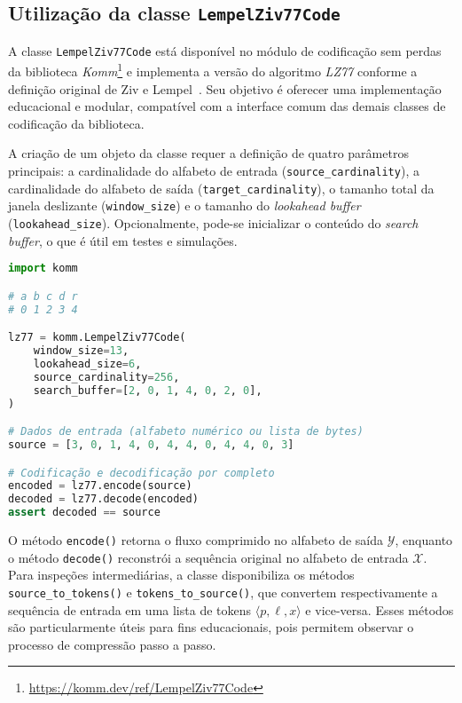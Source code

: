 \subsection{Utilização da classe \texttt{LempelZiv77Code}}

A classe \texttt{LempelZiv77Code} está disponível no módulo de codificação sem
perdas da biblioteca
\textit{Komm}\footnote{\url{https://komm.dev/ref/LempelZiv77Code}} e implementa
a versão do algoritmo \textit{LZ77} conforme a definição original de Ziv e
Lempel~\cite{1055714}. Seu objetivo é oferecer uma implementação educacional e
modular, compatível com a interface comum das demais classes de codificação da
biblioteca.

A criação de um objeto da classe requer a definição de quatro parâmetros
principais: a cardinalidade do alfabeto de entrada
(\texttt{source\_cardinality}), a cardinalidade do alfabeto de saída
(\texttt{target\_cardinality}), o tamanho total da janela deslizante
(\texttt{window\_size}) e o tamanho do \textit{lookahead buffer}
(\texttt{lookahead\_size}). Opcionalmente, pode-se inicializar o conteúdo do
\textit{search buffer}, o que é útil em testes e simulações.

\begin{lstlisting}[language=Python, caption={Exemplo de utilização do \textit{LZ77} na biblioteca \textit{Komm}.}]
import komm

# a b c d r
# 0 1 2 3 4

lz77 = komm.LempelZiv77Code(
    window_size=13,
    lookahead_size=6,
    source_cardinality=256,
    search_buffer=[2, 0, 1, 4, 0, 2, 0],
)

# Dados de entrada (alfabeto numérico ou lista de bytes)
source = [3, 0, 1, 4, 0, 4, 4, 0, 4, 4, 0, 3]

# Codificação e decodificação por completo
encoded = lz77.encode(source)
decoded = lz77.decode(encoded)
assert decoded == source


\end{lstlisting}

O método \texttt{encode()} retorna o fluxo comprimido no alfabeto de saída
\(\mathcal{Y}\), enquanto o método \texttt{decode()} reconstrói a sequência
original no alfabeto de entrada \(\mathcal{X}\). Para inspeções intermediárias,
a classe disponibiliza os métodos \texttt{source\_to\_tokens()} e
\texttt{tokens\_to\_source()}, que convertem respectivamente a sequência de
entrada em uma lista de tokens \(\langle p, \ell, x \rangle\) e vice-versa. Esses
métodos são particularmente úteis para fins educacionais, pois permitem
observar o processo de compressão passo a passo.


